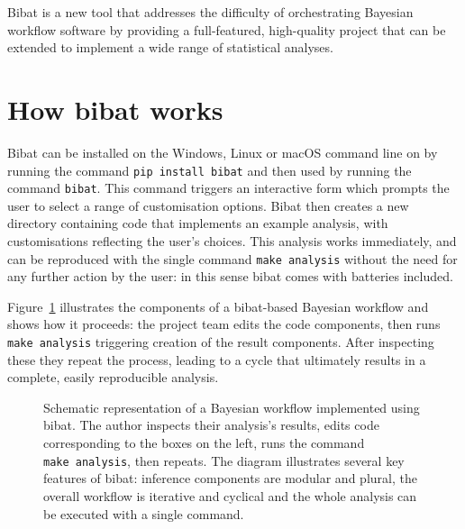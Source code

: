 \documentclass[
  letterpaper,
  DIV=11,
  numbers=noendperiod]{scrartcl}
\begin{document}
Bibat is a new tool that addresses the difficulty of orchestrating
Bayesian workflow software by providing a full-featured, high-quality
project that can be extended to implement a wide range of statistical
analyses.

\section{How bibat works}\label{how-bibat-works}

Bibat can be installed on the Windows, Linux or macOS command line on by
running the command \texttt{pip\ install\ bibat} and then used by
running the command \texttt{bibat}. This command triggers an interactive
form which prompts the user to select a range of customisation options.
Bibat then creates a new directory containing code that implements an
example analysis, with customisations reflecting the user's choices.
This analysis works immediately, and can be reproduced with the single
command \texttt{make\ analysis} without the need for any further action
by the user: in this sense bibat comes with batteries included.

Figure~\ref{fig-workflow} illustrates the components of a bibat-based
Bayesian workflow and shows how it proceeds: the project team edits the
code components, then runs \texttt{make\ analysis} triggering creation
of the result components. After inspecting these they repeat the
process, leading to a cycle that ultimately results in a complete,
easily reproducible analysis.

\begin{figure}


\caption{\label{fig-workflow}Schematic representation of a Bayesian
workflow implemented using bibat. The author inspects their analysis's
results, edits code corresponding to the boxes on the left, runs the
command \texttt{make\ analysis}, then repeats. The diagram illustrates
several key features of bibat: inference components are modular and
plural, the overall workflow is iterative and cyclical and the whole
analysis can be executed with a single command.}

\end{figure}%
\end{document}
